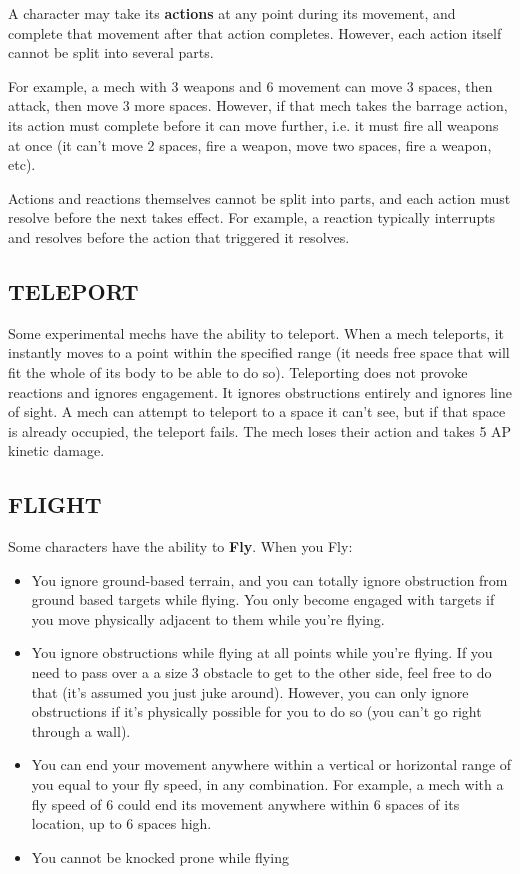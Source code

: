 A character may take its \textbf{actions} at any point during its movement, and complete that movement after that action completes. However, each action itself cannot be split into several parts.

For example, a mech with 3 weapons and 6 movement can move 3 spaces, then attack, then move 3 more spaces. However, if that mech takes the barrage action, its action must complete before it can move further, i.e. it must fire all weapons at once (it can’t move 2 spaces, fire a weapon, move two spaces, fire a weapon, etc).

Actions and reactions themselves cannot be split into parts, and each action must resolve before the next takes effect. For example, a reaction typically interrupts and resolves before the action that triggered it resolves.


\subsection{TELEPORT}

Some experimental mechs have the ability to teleport. When a mech teleports, it instantly moves to a point within the specified range (it needs free space that will fit the whole of its body to be able to do so). Teleporting does not provoke reactions and ignores engagement. It ignores obstructions entirely and ignores line of sight. A mech can attempt to teleport to a space it can’t see, but if that space is already occupied, the teleport fails. The mech loses their action and takes 5 AP kinetic damage.

\subsection{FLIGHT}

Some characters have the ability to \textbf{Fly}. When you Fly:

\begin{itemize}
\item You ignore ground-based terrain, and you can totally ignore obstruction from ground based targets while flying. You only become engaged with targets if you move physically adjacent to them while you’re flying.
\item You ignore obstructions while flying at all points while you’re flying. If you need to pass over a a size 3 obstacle to get to the other side, feel free to do that (it’s assumed you just juke around). However, you can only ignore obstructions if it’s physically possible for you to do so (you can’t go right through a wall).
\item You can end your movement anywhere within a vertical or horizontal range of you equal to your fly speed, in any combination. For example, a mech with a fly speed of 6 could end its movement anywhere within 6 spaces of its location, up to 6 spaces high.
\item You cannot be knocked prone while flying
\end{itemize}

